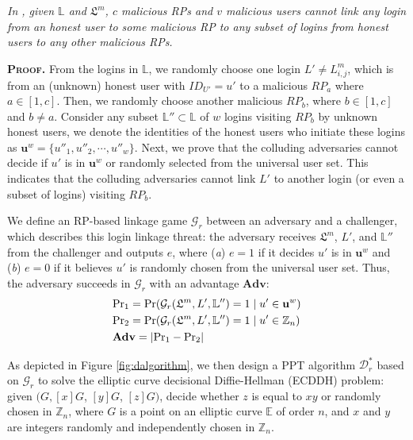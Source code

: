 \begin{thm}[RP Unlinkability]
\emph{In \usso, given $\mathbb{L}$ and $\mathfrak{L}^m$, $c$ malicious RPs and $v$ malicious users cannot link any login from an honest user to some malicious RP to any subset of logins from honest users to any other malicious RPs.}\label{thm-rp-unlinkability}
\end{thm}

\noindent\textbf{\textsc{Proof.}} From the logins in $\mathbb{L}$,
 we randomly choose one login $L' \neq L^m_{i,j}$,
 which is from an (unknown) honest user with $ID_{U'}=u'$ to a malicious $RP_{a}$ where $a \in [1,c]$.
Then, we randomly choose another malicious $RP_{b}$, where $b \in [1,c]$ and $b \neq a$.
Consider any subset $\mathbb{L}'' \subset \mathbb{L}$ of $w$ logins visiting $RP_{b}$ by unknown honest users,
 we denote the identities of the honest users who initiate these logins as $\mathbf{u}^w=\{{u''_1}, {u''_2}, \cdots, {u''_w}\}$.
Next, we prove that the colluding adversaries cannot decide if $u'$ is in $\mathbf{u}^w$ or randomly selected from the universal user set.
This indicates that the colluding adversaries cannot link $L'$ to another login (or even a subset of logins) visiting $RP_{b}$.


We define an RP-based linkage game $\mathcal{G}_r$ between an adversary and a challenger, which describes this login linkage threat: the adversary receives $\mathfrak{L}^m$, $L'$, and $\mathbb{L}''$ from the challenger and outputs $e$, where (\emph{a}) $e = 1$ if it decides $u'$ is in $\mathbf{u}^w$ %
and (\emph{b}) $e=0$ if it believes $u'$ is randomly chosen from the universal user set.
Thus, the adversary succeeds in $\mathcal{G}_r$ with an advantage $\mathbf{Adv}$:
\begin{align*}
&{\rm Pr}_1={\rm Pr}(\mathcal{G}_r(\mathfrak{L}^m, L', \mathbb{L}'')=1 \;| \; u' \in \mathbf{u}^w)  \\
&{\rm Pr}_2={\rm Pr}(\mathcal{G}_r(\mathfrak{L}^m, L', \mathbb{L}'')=1 \; | \; u' \in \mathbb{Z}_n)\\
&{\mathbf{Adv}}=|{\rm Pr}_1-{\rm Pr}_2|
\end{align*}

As depicted in Figure \ref{fig:dalgorithm}, we then design a PPT algorithm $\mathcal{D}^*_r$ based on $\mathcal{G}_r$ to solve the elliptic curve decisional Diffie-Hellman (ECDDH) problem: given $(G, [x]G$, $[y]G$, $[z]G)$, decide whether $z$ is equal to $xy$ or randomly chosen in $\mathbb{Z}_n$, where $G$ is a point on an elliptic curve $\mathbb{E}$ of order $n$, and $x$ and $y$ are integers randomly and independently chosen in $\mathbb{Z}_n$.


